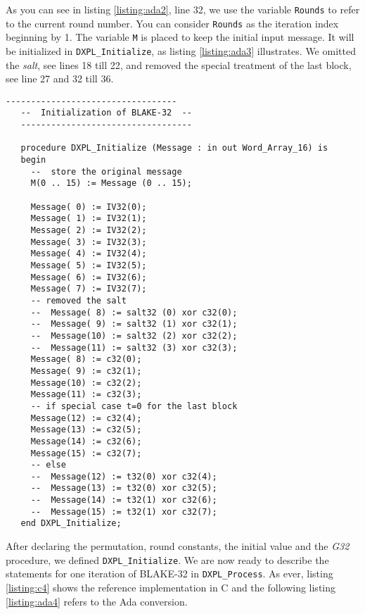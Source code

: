 \documentclass{acmtrans2m}
\begin{document}
As you can see in listing \ref{listing:ada2}, line 32, we use the variable
\texttt{Rounds} to refer to the current round number. You can consider
\texttt{Rounds} as the iteration index beginning by 1. The variable \texttt{M}
is placed to keep the initial input message. It will be initialized in \texttt{DXPL\_Initialize}, 
as listing \ref{listing:ada3} illustrates. We omitted the \textit{salt}, see lines
18 till 22, and removed the special treatment of the last block, see line 27 and
32 till 36.

\begin{lstlisting}[caption={DXPL\_Initialize assigns the original message
to the variable M and assigns the initial value to Message. For simplicity
and readability, we omitted the rest of the template.},label=listing:ada3]
   ----------------------------------
   --  Initialization of BLAKE-32  --
   ----------------------------------

   procedure DXPL_Initialize (Message : in out Word_Array_16) is
   begin
     --  store the original message
     M(0 .. 15) := Message (0 .. 15);

     Message( 0) := IV32(0);
     Message( 1) := IV32(1);
     Message( 2) := IV32(2);
     Message( 3) := IV32(3);
     Message( 4) := IV32(4);
     Message( 5) := IV32(5);
     Message( 6) := IV32(6);
     Message( 7) := IV32(7);
     -- removed the salt
     --  Message( 8) := salt32 (0) xor c32(0);
     --  Message( 9) := salt32 (1) xor c32(1);
     --  Message(10) := salt32 (2) xor c32(2);
     --  Message(11) := salt32 (3) xor c32(3);
     Message( 8) := c32(0);
     Message( 9) := c32(1);
     Message(10) := c32(2);
     Message(11) := c32(3);
     -- if special case t=0 for the last block
     Message(12) := c32(4);
     Message(13) := c32(5);
     Message(14) := c32(6);
     Message(15) := c32(7);
     -- else
     --  Message(12) := t32(0) xor c32(4);
     --  Message(13) := t32(0) xor c32(5);
     --  Message(14) := t32(1) xor c32(6);
     --  Message(15) := t32(1) xor c32(7);
   end DXPL_Initialize;
\end{lstlisting}

\vfill

After declaring the permutation, round constants, the initial value and
the \textit{G32} procedure, we defined \texttt{DXPL\_Initialize}. We are
now ready to describe the statements for one iteration of BLAKE-32
in \texttt{DXPL\_Process}. As ever, listing \ref{listing:c4} shows the 
reference implementation in C and the following listing \ref{listing:ada4}
refers to the Ada conversion.
\end{document}
